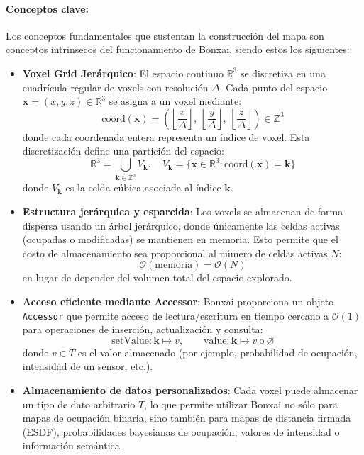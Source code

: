 \documentclass[12pt, a4paper, twoside]{article}
\begin{document}
\paragraph{Conceptos clave:}
Los conceptos fundamentales que sustentan la construcción del mapa son conceptos intrinsecos del funcionamiento de Bonxai, siendo estos los siguientes:
\begin{itemize}
  \item \textbf{Voxel Grid Jerárquico}:  
  El espacio continuo \(\mathbb{R}^{3}\) se discretiza en una cuadrícula regular de voxels con resolución \(\Delta\).  
  Cada punto del espacio \(\mathbf{x} = (x,y,z) \in \mathbb{R}^{3}\) se asigna a un voxel mediante:
  \[
  \mathrm{coord}(\mathbf{x}) = \left( 
  \left\lfloor \frac{x}{\Delta} \right\rfloor,\ 
  \left\lfloor \frac{y}{\Delta} \right\rfloor,\ 
  \left\lfloor \frac{z}{\Delta} \right\rfloor
  \right) \in \mathbb{Z}^{3}
  \]
  donde cada coordenada entera representa un índice de voxel.  
  Esta discretización define una partición del espacio:
  \[
  \mathbb{R}^{3} = \bigcup_{\mathbf{k} \in \mathbb{Z}^{3}} V_{\mathbf{k}}, \quad
  V_{\mathbf{k}} = \{\mathbf{x} \in \mathbb{R}^{3} : \mathrm{coord}(\mathbf{x}) = \mathbf{k}\}
  \]
  donde \(V_{\mathbf{k}}\) es la celda cúbica asociada al índice \(\mathbf{k}\).
  \item \textbf{Estructura jerárquica y esparcida}:  
  Los voxels se almacenan de forma dispersa usando un árbol jerárquico, donde únicamente las celdas activas (ocupadas o modificadas) se mantienen en memoria.  
  Esto permite que el costo de almacenamiento sea proporcional al número de celdas activas \(N\):
  \[
  \mathcal{O}(\text{memoria}) = \mathcal{O}(N)
  \]
  en lugar de depender del volumen total del espacio explorado.
  \item \textbf{Acceso eficiente mediante Accessor}:  
  Bonxai proporciona un objeto \texttt{Accessor} que permite acceso de lectura/escritura en tiempo cercano a \(\mathcal{O}(1)\) para operaciones de inserción, actualización y 
  consulta:
  \[
  \text{setValue}: \mathbf{k} \mapsto v, \qquad
  \text{value}: \mathbf{k} \mapsto v \ \text{o} \ \varnothing
  \]
  donde \(v \in T\) es el valor almacenado (por ejemplo, probabilidad de ocupación, intensidad de un sensor, etc.).
  \item \textbf{Almacenamiento de datos personalizados}:  
  Cada voxel puede almacenar un tipo de dato arbitrario \(T\), lo que permite utilizar Bonxai no sólo para mapas de ocupación binaria, sino también para mapas de distancia firmada 
  (ESDF), probabilidades bayesianas de ocupación, valores de intensidad o información semántica.

\end{itemize}
\end{document}
